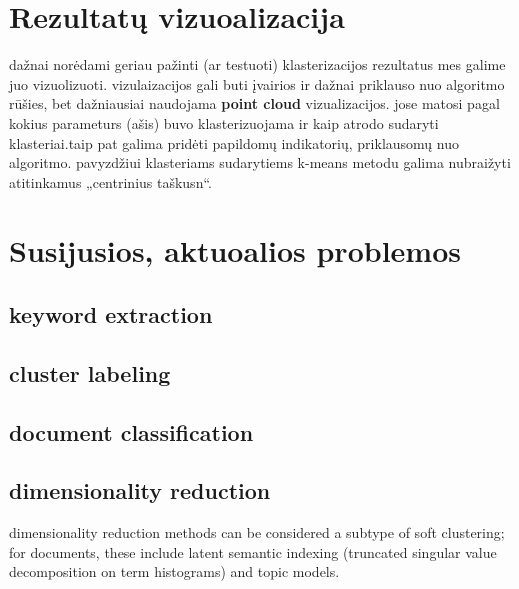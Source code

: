 \documentclass{VUMIFInfKursinis}
\begin{document}
\section{Rezultatų vizuoalizacija}
	dažnai norėdami geriau pažinti (ar testuoti) klasterizacijos rezultatus mes galime juo vizuolizuoti. vizulaizacijos gali buti įvairios ir dažnai priklauso nuo algoritmo rūšies, bet dažniausiai naudojama \textbf{point cloud} vizualizacijos. jose matosi pagal kokius parameturs (ašis) buvo klasterizuojama ir kaip atrodo sudaryti klasteriai.taip pat galima pridėti papildomų indikatorių, priklausomų nuo algoritmo. pavyzdžiui klasteriams sudarytiems k-means metodu galima nubraižyti atitinkamus „centrinius taškusn“.

\section{Susijusios, aktuoalios problemos}
	\subsection{keyword extraction}
	\subsection{cluster labeling}
	\subsection{document classification}
	\subsection{dimensionality reduction}
	dimensionality reduction methods can be considered a subtype of soft clustering; for documents, these include latent semantic indexing (truncated singular value decomposition on term histograms) and topic models.


\printbibliography[heading=bibintoc] %

\appendix  %
\end{document}
